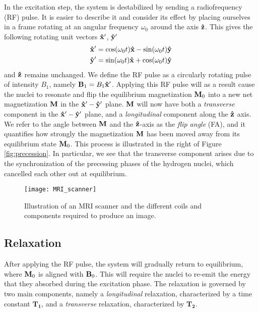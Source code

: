 In the excitation step, the system is destabilized by sending a radiofrequency (RF) pulse. It is easier to describe it and consider its effect by placing ourselves in a frame rotating at an angular frequency $\omega_0$ around the axis $\mathbf{\hat{z}}$. This gives the following rotating unit vectors $\mathbf{\hat{x}'}$, $\mathbf{\hat{y}'}$ 
\begin{align*}
    \mathbf{\hat{x}'}&=\cos(\omega_0 t)\mathbf{\hat{x}} -  \sin(\omega_0 t)\mathbf{\hat{y}}\\
    \mathbf{\hat{y}'}&= \sin(\omega_0 t)\mathbf{\hat{x}} + \cos(\omega_0 t)\mathbf{\hat{y}}
\end{align*}
and $\mathbf{\hat{z}}$ remains unchanged. We define the RF pulse as a circularly rotating pulse of intensity $B_1$, namely $\mathbf{B}_1 = B_1 \mathbf{\hat{x}'}$. Applying this RF pulse will as a result cause the nuclei to resonate and flip the equilibrium magnetization $\mathbf{M}_0$ into a new net magnetization $\mathbf{M}$ in the $\mathbf{\hat{x}'}-\mathbf{\hat{y}'}$ plane. $\mathbf{M}$ will now have both a \textit{transverse} component in the $\mathbf{\hat{x}'}-\mathbf{\hat{y}'}$ plane, and a \textit{longitudinal} component along the $\mathbf{\hat{z}}$ axis. We refer to the angle between $\mathbf{M}$ and the $\mathbf{\hat{z}}$-axis as the \textit{flip angle} (FA), and it quantifies how strongly the magnetization $\mathbf{M}$ has been moved away from its equilibrium state $\mathbf{M}_0$. This process is illustrated in the right of Figure \ref{fig:precession}. In particular, we see that the transverse component arises due to the synchronization of the precessing phases of the hydrogen nuclei, which  cancelled each other out at equilibrium.

\begin{figure}
    \centering
    \texttt{[image: MRI\_scanner]}
    \caption{Illustration of an MRI scanner and the different coils and components required to produce an image.}\label{fig:MRI_scanner}
\end{figure}

\subsection{Relaxation}
After applying the RF pulse, the system will gradually return to equilibrium, where $\mathbf{M}_0$ is aligned with $\mathbf{B}_0$. This will require the nuclei to re-emit the energy that they absorbed during the excitation phase. The relaxation is governed by two main components, namely a \textit{longitudinal} relaxation, characterized by a time constant $\mathbf{T_1}$, and a \textit{transverse} relaxation, characterized by  $\mathbf{T_2}$.

